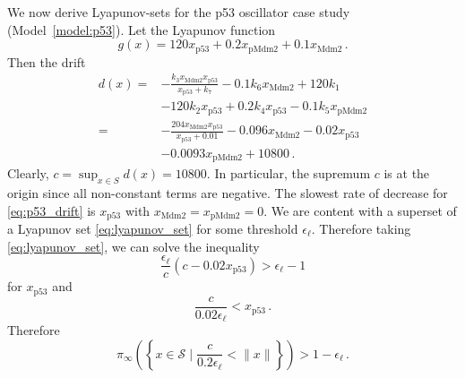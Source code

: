 We now derive Lyapunov-sets for the p53 oscillator case study (Model~\ref{model:p53}). Let the Lyapunov function
\begin{equation}
    g(x) = 120 x_{\mathrm{p53}} + 0.2 x_{\mathrm{pMdm2}} + 0.1 x_{\mathrm{Mdm2}}\,.
\end{equation}
Then the drift
\begin{equation}\label{eq:p53_drift}
\begin{split}
    d(x) = & - \frac{k_3 x_{\mathrm{Mdm2}} x_{\mathrm{p53}}}{x_{\mathrm{p53}} + k_7}
            - 0.1 k_6 x_{\mathrm{Mdm2}}
            + 120 k_1 \\
          & - 120 k_2 x_{\mathrm{p53}}
            + 0.2 k_4 x_{\mathrm{p53}}
            - 0.1 k_5 x_{\mathrm{pMdm2}}  \\
        = & - \frac{204 x_{\mathrm{Mdm2}} x_{\mathrm{p53}}}{x_{\mathrm{p53}} + 0.01}
            - 0.096 x_{\mathrm{Mdm2}}
            - 0.02 x_{\mathrm{p53}} \\
            &- 0.0093 x_{\mathrm{pMdm2}}
	    + \num{10800}\,. 
\end{split}
\end{equation}
Clearly, $c = \sup_{x\in{S}} d(x) = \num{10800}$.
In particular, the supremum $c$ is at the origin since all non-constant terms are negative.
The slowest rate of decrease for \eqref{eq:p53_drift} is $x_{\mathrm{p53}}$ with $x_{\mathrm{Mdm2}} = x_{\mathrm{pMdm2}} = 0$.
We are content with a superset of a Lyapunov set \eqref{eq:lyapunov_set} for some threshold $\epsilon_{\ell}$.
Therefore taking \eqref{eq:lyapunov_set}, we can solve the inequality
\[
	\frac{\epsilon_{\ell}}{c}(c - \num{0.02} x_{\mathrm{p53}}) > \epsilon_{\ell} - 1
\]
for $x_{\mathrm{p53}}$ and 
\begin{equation*}
    \frac{c}{0.02 \epsilon_{\ell}} < x_{\mathrm{p53}}\,.
\end{equation*}
Therefore
\begin{equation*}
\pi_{\infty}\left(\left\{x\in\mathcal{S} \mid \frac{c}{0.2\epsilon_{\ell}} < \lVert x \rVert \right\}\right) > 1 - \epsilon_{\ell}\,.
\end{equation*}

